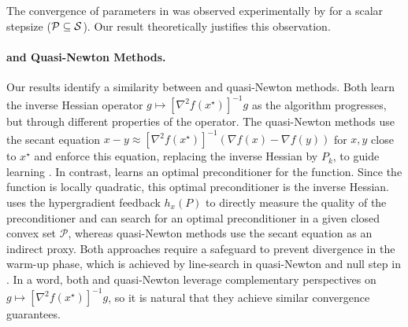 \begin{rem}
The convergence of parameters in {\hdm} was observed experimentally by \cite{gunes2018online} for a scalar stepsize ($\mathcal{P} \subseteq \mathcal{S}$). Our result theoretically justifies this observation.
\end{rem}

\paragraph{{\hdm} and Quasi-Newton Methods.}
Our results identify a similarity between {\hdm} and quasi-Newton methods.
Both learn the inverse Hessian operator $g \mapsto [\nabla^2 f (x^{\star})]^{-1} g$ as the algorithm progresses, but through different properties of the operator.
The quasi-Newton methods use the secant equation 
$x - y \approx [\nabla^2 f(x^\star)]^{-1}(\nabla f(x)- \nabla f(y))$ for $x, y$ close to $x^\star$ and enforce this equation, replacing the inverse Hessian by $P_k$,
to guide learning \cite{jiang2023online, jiang2024online}.
In contrast, {\hdm} learns an optimal preconditioner for the function. 
Since the function is locally quadratic, this optimal preconditioner is the inverse Hessian.
{\hdm} uses the hypergradient feedback $h_x(P)$ to directly measure the quality of the preconditioner and can search for an optimal preconditioner in a given closed convex set $\mathcal{P}$, whereas quasi-Newton methods use the secant equation as an indirect proxy.
Both approaches require a safeguard to prevent divergence in the warm-up phase, which is achieved by line-search in quasi-Newton  and null step in {\hdm}. 
 In a word, both {\hdm} and quasi-Newton leverage complementary perspectives on $g \mapsto [\nabla^2 f (x^{\star})]^{-1} g$, so it is natural that they achieve similar convergence guarantees.

